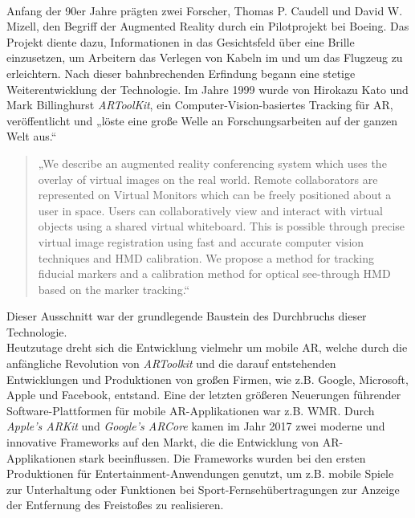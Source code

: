 \\ 
Anfang der 90er Jahre prägten zwei Forscher, Thomas P. Caudell und David W. Mizell, den Begriff der Augmented Reality durch ein Pilotprojekt
bei Boeing. Das Projekt diente dazu, Informationen in das Gesichtsfeld über eine Brille einzusetzen, um Arbeitern das Verlegen von Kabeln im und um das 
Flugzeug zu erleichtern. Nach dieser bahnbrechenden Erfindung begann eine stetige Weiterentwicklung der Technologie. Im Jahre 1999 wurde 
von Hirokazu Kato und Mark Billinghurst \textit{ARToolKit}, ein Computer-Vision-basiertes Tracking für AR, veröffentlicht und „löste eine 
große Welle an Forschungsarbeiten auf der ganzen Welt aus.“ \cite{springer.2019s} 
\begin{quote}
    „We describe an augmented reality conferencing system which uses the overlay of virtual images on the real world. Remote collaborators 
    are represented on Virtual Monitors which can be freely positioned about a user in space. Users can collaboratively view and interact 
    with virtual objects using a shared virtual whiteboard. This is possible through precise virtual image registration using fast and 
    accurate computer vision techniques and HMD calibration. We propose a method for tracking fiducial markers and a calibration method 
    for optical see-through HMD based on the marker tracking.“ \cite{artoolkitsheet.1999o}
\end{quote}
Dieser Ausschnitt war der grundlegende Baustein des Durchbruchs dieser Technologie.%
\\ 
Heutzutage dreht sich die Entwicklung vielmehr um mobile AR, welche durch die anfängliche Revolution von \textit{ARToolkit} und die darauf 
entstehenden Entwicklungen und Produktionen von großen Firmen, wie z.B. Google, Microsoft, Apple und Facebook, entstand. Eine der letzten 
größeren Neuerungen führender Software-Plattformen für mobile AR-Applikationen war z.B. \acl{WMR}. Durch 
\textit{Apple's ARKit} und \textit{Google's ARCore} kamen im Jahr 2017 zwei moderne und innovative Frameworks auf den Markt, die die 
Entwicklung von \acl{AR}-Applikationen stark beeinflussen. Die Frameworks wurden bei den ersten Produktionen für Entertainment-Anwendungen 
genutzt, um z.B. mobile Spiele zur Unterhaltung oder Funktionen bei Sport-Fernsehübertragungen zur Anzeige der Entfernung des Freistoßes zu 
realisieren.
\\ 
\linebreak
